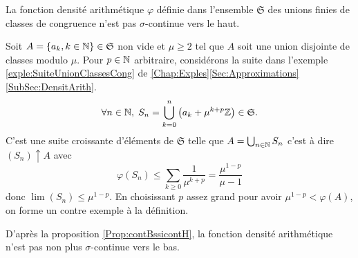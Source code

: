 \begin{propn} \label{Prop:DensitArithNonCont}
 La fonction densité arithmétique $\varphi$ définie dans l'ensemble $\mathfrak{S}$ des unions finies de classes de congruence n'est pas $\sigma$-continue vers le haut.
\end{propn}
\begin{demo}
 Soit $A = \left\lbrace a_k, k\in \mathbb{N}\right\rbrace \in \mathfrak{S}$ non vide et $\mu\geq 2$ tel que $A$ soit une union disjointe de classes modulo $\mu$. Pour $p\in \mathbb{N}$ arbitraire, considérons la suite dans l'exemple \ref{exple:SuiteUnionClassesCong} de \ref{Chap:Exples}\ref{Sec:Approximations}\ref{SubSec:DensitArith}.
\begin{displaymath}
 \forall n \in \mathbb{N}, \; S_n = \bigcup_{k =0}^n \left(a_k + \mu^{k+p} \mathbb{Z}\right) \in \mathfrak{S}.
\end{displaymath}
C'est une suite croissante d'éléments de $\mathfrak{S}$ telle que $A = \bigcup_{n\in \mathbb{N}}S_n$ c'est à dire $(S_n)\uparrow A$ avec
\begin{displaymath}
 \varphi(S_n) \leq \sum_{k\geq 0} \frac{1}{\mu^{k+p}} = \frac{\mu^{1-p}}{\mu - 1}
\end{displaymath}
donc $\lim (S_n)\leq \mu^{1-p}$. En choisissant $p$ assez grand pour avoir $\mu^{1-p} < \varphi(A)$, on forme un contre exemple à la définition.
\end{demo}
\begin{rem}
 D'après la proposition \ref{Prop:contBssicontH}, la fonction densité arithmétique n'est pas non plus $\sigma$-continue vers le bas.
\end{rem}


